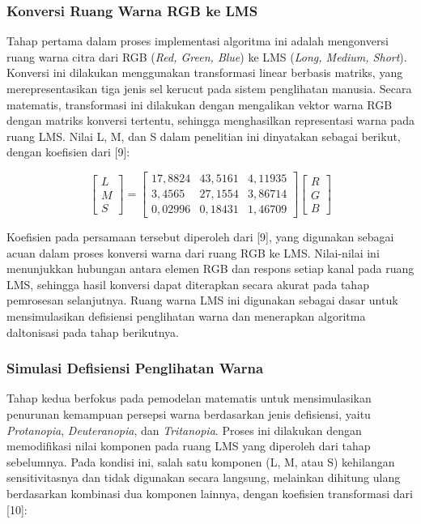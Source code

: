 \subsubsection{Konversi Ruang Warna RGB ke LMS}

Tahap pertama dalam proses implementasi algoritma ini adalah mengonversi ruang warna citra dari RGB (\textit{Red, Green, Blue}) ke LMS (\textit{Long, Medium, Short}). Konversi ini dilakukan menggunakan transformasi linear berbasis matriks, yang merepresentasikan tiga jenis sel kerucut pada sistem penglihatan manusia. Secara matematis, transformasi ini dilakukan dengan mengalikan vektor warna RGB dengan matriks konversi tertentu, sehingga menghasilkan representasi warna pada ruang LMS. Nilai L, M, dan S dalam penelitian ini dinyatakan sebagai berikut, dengan koefisien dari [9]:

\begin{equation}
\begin{bmatrix} L \\ M \\ S \end{bmatrix} =
\begin{bmatrix} 17{,}8824 & 43{,}5161 & 4{,}11935 \\ 3{,}4565 & 27{,}1554 & 3{,}86714 \\ 0{,}02996 & 0{,}18431 & 1{,}46709 \end{bmatrix}
\begin{bmatrix} R \\ G \\ B \end{bmatrix}
\end{equation}

Koefisien pada persamaan tersebut diperoleh dari [9], yang digunakan sebagai acuan dalam proses konversi warna dari ruang RGB ke LMS. Nilai-nilai ini menunjukkan hubungan antara elemen RGB dan respons setiap kanal pada ruang LMS, sehingga hasil konversi dapat diterapkan secara akurat pada tahap pemrosesan selanjutnya. Ruang warna LMS ini digunakan sebagai dasar untuk mensimulasikan defisiensi penglihatan warna dan menerapkan algoritma daltonisasi pada tahap berikutnya.

\subsubsection{Simulasi Defisiensi Penglihatan Warna}

Tahap kedua berfokus pada pemodelan matematis untuk mensimulasikan penurunan kemampuan persepsi warna berdasarkan jenis defisiensi, yaitu \textit{Protanopia}, \textit{Deuteranopia}, dan \textit{Tritanopia}. Proses ini dilakukan dengan memodifikasi nilai komponen pada ruang LMS yang diperoleh dari tahap sebelumnya. Pada kondisi ini, salah satu komponen (L, M, atau S) kehilangan sensitivitasnya dan tidak digunakan secara langsung, melainkan dihitung ulang berdasarkan kombinasi dua komponen lainnya, dengan koefisien transformasi dari [10]:

